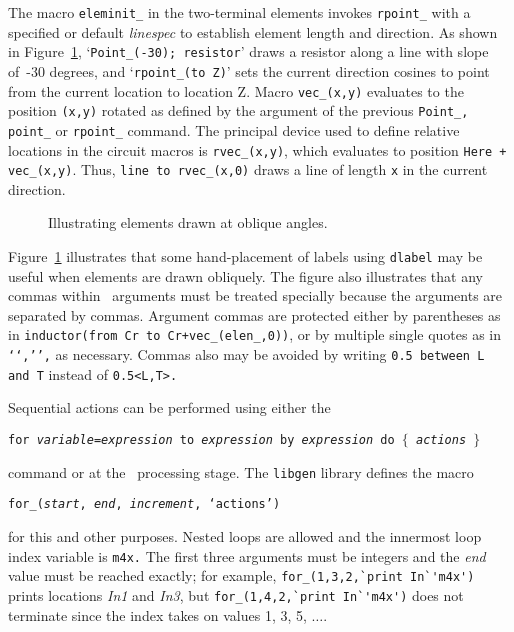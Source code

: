 The macro {\tt eleminit\_} in the two-terminal elements invokes
{\tt rpoint\_} with a specified or default {\sl linespec}
to establish element length and direction.
As shown in Figure~\ref{Oblique},
`{\tt Point\_(-30); resistor}' draws a resistor
along a line with slope of~-30 degrees, and `{\tt rpoint\_(to Z)}' sets
the current direction cosines to point from the current location to location Z.
Macro {\tt vec\_(x,y)}
evaluates to the position {\tt (x,y)} rotated as defined by the
argument of the previous {\tt Point\_, point\_} or {\tt rpoint\_} command.
The principal device used to define relative locations in the circuit macros
is {\tt rvec\_(x,y)}, which evaluates to position {\tt Here + vec\_(x,y)}.
Thus, {\tt line to rvec\_(x,0)} draws a line of length {\tt x} in the current
direction.
\begin{figure}[!ht]
\vspace{-\baselineskip}
   \parbox{4.5in}{\small }%
   \hfill\raise-0.7in\llap{\hbox{ }}%
   \vspace{-\baselineskip}
   \caption{Illustrating elements drawn at oblique angles.}
   \label{Oblique}
   \end{figure}

Figure~\ref{Oblique} illustrates that some hand-placement of labels
using {\tt dlabel} may be useful when elements are drawn obliquely.
The figure also illustrates that any commas within \Mfour\ arguments must
be treated specially because the arguments are separated by commas.
Argument commas are protected either by parentheses as in
{\tt inductor(from Cr to Cr+vec\_(elen\_,0))}, or by multiple single quotes
as in {\tt `{}`,'{}',} as necessary.  Commas also may be avoided by writing
{\tt 0.5 between L and T} instead of {\tt 0.5<L,T>.}

Sequential actions can be performed using either the
 \dpic

{\tt for {\sl variable}={\sl expression} to {\sl expression}
 by {\sl expression} do $\lbrace$ {\sl actions} $\rbrace$}

command or at the
\Mfour\ processing stage.  The {\tt libgen} library defines the macro

{\tt for\_({\sl start}, {\sl end}, {\sl increment}, `{\sl actions}')}

\noindent
for this and other purposes.  Nested loops are allowed and the innermost loop
index variable is {\tt m4x.}
The first three arguments must be
integers and the {\sl end} value must be reached exactly; for example,
\verb|for_(1,3,2,`print In`'m4x')| prints locations {\sl In1} and {\sl In3},
but \verb|for_(1,4,2,`print In`'m4x')| does not terminate since the
index takes on values 1, 3, 5, $\ldots$.

